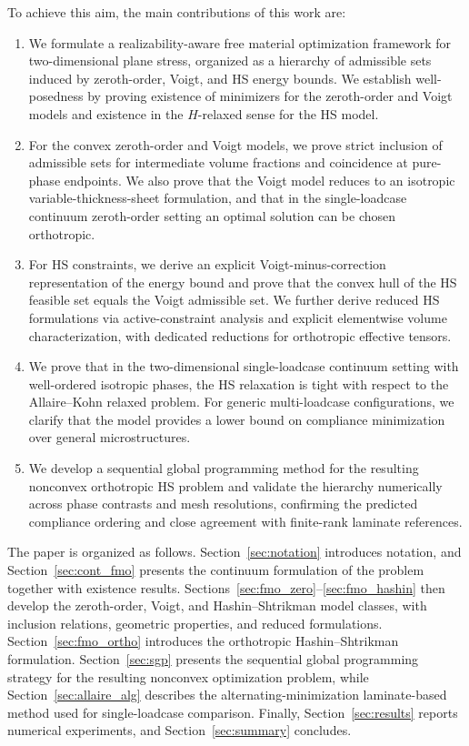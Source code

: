 \documentclass[preprint,3p]{elsarticle}
\begin{document}
To achieve this aim, the main contributions of this work are:
\begin{enumerate}
    \item We formulate a realizability-aware free material optimization framework for two-dimensional plane stress, organized as a hierarchy of admissible sets induced by zeroth-order, Voigt, and HS energy bounds. We establish well-posedness by proving existence of minimizers for the zeroth-order and Voigt models and existence in the $H$-relaxed sense for the HS model.
    \item For the convex zeroth-order and Voigt models, we prove strict inclusion of admissible sets for intermediate volume fractions and coincidence at pure-phase endpoints. We also prove that the Voigt model reduces to an isotropic variable-thickness-sheet formulation, and that in the single-loadcase continuum zeroth-order setting an optimal solution can be chosen orthotropic.
    \item For HS constraints, we derive an explicit Voigt-minus-correction representation of the energy bound and prove that the convex hull of the HS feasible set equals the Voigt admissible set. We further derive reduced HS formulations via active-constraint analysis and explicit elementwise volume characterization, with dedicated reductions for orthotropic effective tensors.
    \item We prove that in the two-dimensional single-loadcase continuum setting with well-ordered isotropic phases, the HS relaxation is tight with respect to the Allaire--Kohn relaxed problem. For generic multi-loadcase configurations, we clarify that the model provides a lower bound on compliance minimization over general microstructures.
    \item We develop a sequential global programming method for the resulting nonconvex orthotropic HS problem and validate the hierarchy numerically across phase contrasts and mesh resolutions, confirming the predicted compliance ordering and close agreement with finite-rank laminate references.
\end{enumerate}

The paper is organized as follows. Section~\ref{sec:notation} introduces notation, and Section~\ref{sec:cont_fmo} presents the continuum formulation of the problem together with existence results. Sections~\ref{sec:fmo_zero}--\ref{sec:fmo_hashin} then develop the zeroth-order, Voigt, and Hashin--Shtrikman model classes, with inclusion relations, geometric properties, and reduced formulations. Section~\ref{sec:fmo_ortho} introduces the orthotropic Hashin--Shtrikman formulation. Section~\ref{sec:sgp} presents the sequential global programming strategy for the resulting nonconvex optimization problem, while Section~\ref{sec:allaire_alg} describes the alternating-minimization laminate-based method used for single-loadcase comparison. Finally, Section~\ref{sec:results} reports numerical experiments, and Section~\ref{sec:summary} concludes.
\end{document}
